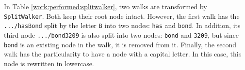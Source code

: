 \begin{table}[!ht]
  \centering
  \caption{Example of Use of \texttt{SplitWalker}.}
  \label{work:performed:splitwalker}
\end{table}

In Table \ref{work:performed:splitwalker}, two walks are transformed by
\texttt{SplitWalker}. Both keep their root node intact. However, the first walk
has the \texttt{.../hasBond} split by the letter \texttt{B} into two nodes:
\texttt{has} and \texttt{bond}. In addition, its third node
\texttt{.../bond3209} is also split into two nodes: \texttt{bond} and
\texttt{3209}, but since \texttt{bond} is an existing node in the walk, it is
removed from it. Finally, the second walk has the particularity to have a node
with a capital letter. In this case, this node is rewritten in lowercase.

